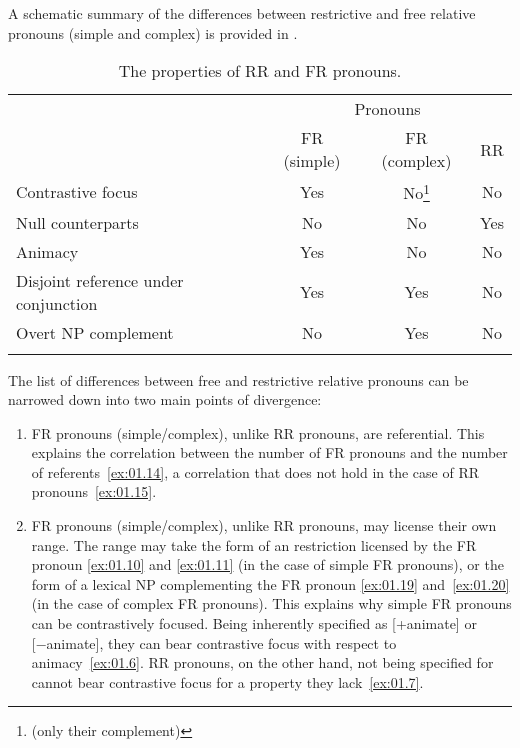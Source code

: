 \documentclass[output=paper]{langsci/langscibook}
\begin{document}
A schematic summary of the differences between restrictive and free relative
pronouns (simple and complex) is provided in .

\begin{table}
\caption{The properties of \gls{RR} and \gls{FR} pronouns.\label{tab:3}}
\begin{tabular}{lccc}
\lsptoprule
                                     & \multicolumn{3}{c}{Pronouns}\\\cmidrule(lr){2-4}
                                     & \gls{FR} (simple)           & \gls{FR} (complex)& \gls{RR} \\\midrule
Contrastive focus                    & Yes                       & No\footnote{(only their complement)}  & No \\
Null counterparts                    & No                        & No                                    & Yes \\
Animacy                              & Yes                       & No                                    & No \\
Disjoint reference under conjunction & Yes                       & Yes                                   & No \\
Overt NP complement                  & No                        & Yes                                   & No \\
\lspbottomrule
\end{tabular}
\end{table}

The list of differences between free and restrictive relative pronouns can be
narrowed down into two main points of divergence:

\begin{enumerate}
\item \gls{FR} pronouns (simple/complex), unlike \gls{RR} pronouns, are
referential. This explains the correlation between the number of \gls{FR}
pronouns and the number of referents~\eqref{ex:01.14}, a correlation that does not hold in
the case of \gls{RR} pronouns~\eqref{ex:01.15}.

\item \gls{FR} pronouns
(simple/complex), unlike \gls{RR} pronouns, may license their own range. The
range may take the form of an  restriction licensed by the
\gls{FR} pronoun \eqref{ex:01.10} and \eqref{ex:01.11} (in the case of
simple \gls{FR} pronouns), or the form of a lexical NP complementing the
\gls{FR} pronoun \eqref{ex:01.19} and~\eqref{ex:01.20} (in the case of
complex \gls{FR} pronouns). This explains why simple \gls{FR} pronouns can be
contrastively focused. Being inherently specified as [+animate] or
[−animate], they can bear contrastive focus with respect to animacy~\eqref{ex:01.6}.  \gls{RR} pronouns, on
    the other hand, not being specified for  cannot bear
    contrastive focus for a property they
    lack~\eqref{ex:01.7}.
\end{enumerate}
\end{document}
